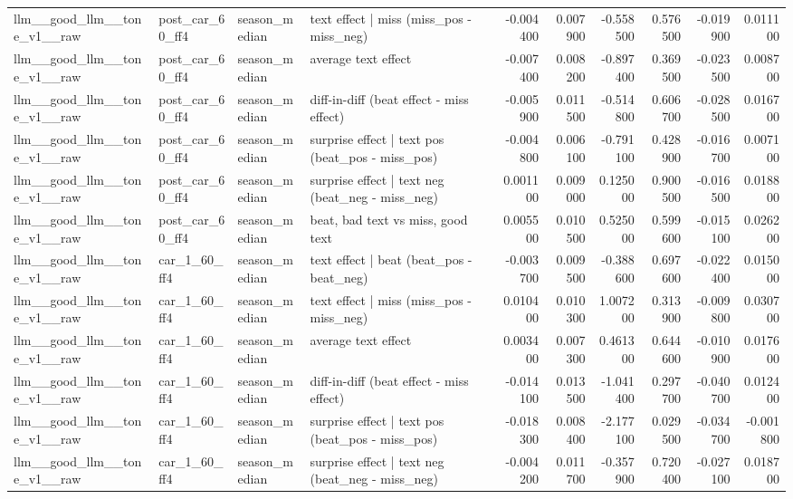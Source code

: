 \begin{table}
\begin{tabular}{llllrrrrrr}
llm\_\_good\_llm\_\_tone\_v1\_\_raw & post\_car\_60\_ff4 & season\_median & text effect | miss  (miss\_pos - miss\_neg) & -0.004400 & 0.007900 & -0.558500 & 0.576500 & -0.019900 & 0.011100 \\
llm\_\_good\_llm\_\_tone\_v1\_\_raw & post\_car\_60\_ff4 & season\_median & average text effect & -0.007400 & 0.008200 & -0.897400 & 0.369500 & -0.023500 & 0.008700 \\
llm\_\_good\_llm\_\_tone\_v1\_\_raw & post\_car\_60\_ff4 & season\_median & diff-in-diff (beat effect - miss effect) & -0.005900 & 0.011500 & -0.514800 & 0.606700 & -0.028500 & 0.016700 \\
llm\_\_good\_llm\_\_tone\_v1\_\_raw & post\_car\_60\_ff4 & season\_median & surprise effect | text pos (beat\_pos - miss\_pos) & -0.004800 & 0.006100 & -0.791100 & 0.428900 & -0.016700 & 0.007100 \\
llm\_\_good\_llm\_\_tone\_v1\_\_raw & post\_car\_60\_ff4 & season\_median & surprise effect | text neg (beat\_neg - miss\_neg) & 0.001100 & 0.009000 & 0.125000 & 0.900500 & -0.016500 & 0.018800 \\
llm\_\_good\_llm\_\_tone\_v1\_\_raw & post\_car\_60\_ff4 & season\_median & beat, bad text vs miss, good text & 0.005500 & 0.010500 & 0.525000 & 0.599600 & -0.015100 & 0.026200 \\
llm\_\_good\_llm\_\_tone\_v1\_\_raw & car\_1\_60\_ff4 & season\_median & text effect | beat  (beat\_pos - beat\_neg) & -0.003700 & 0.009500 & -0.388600 & 0.697600 & -0.022400 & 0.015000 \\
llm\_\_good\_llm\_\_tone\_v1\_\_raw & car\_1\_60\_ff4 & season\_median & text effect | miss  (miss\_pos - miss\_neg) & 0.010400 & 0.010300 & 1.007200 & 0.313900 & -0.009800 & 0.030700 \\
llm\_\_good\_llm\_\_tone\_v1\_\_raw & car\_1\_60\_ff4 & season\_median & average text effect & 0.003400 & 0.007300 & 0.461300 & 0.644600 & -0.010900 & 0.017600 \\
llm\_\_good\_llm\_\_tone\_v1\_\_raw & car\_1\_60\_ff4 & season\_median & diff-in-diff (beat effect - miss effect) & -0.014100 & 0.013500 & -1.041400 & 0.297700 & -0.040700 & 0.012400 \\
llm\_\_good\_llm\_\_tone\_v1\_\_raw & car\_1\_60\_ff4 & season\_median & surprise effect | text pos (beat\_pos - miss\_pos) & -0.018300 & 0.008400 & -2.177100 & 0.029500 & -0.034700 & -0.001800 \\
llm\_\_good\_llm\_\_tone\_v1\_\_raw & car\_1\_60\_ff4 & season\_median & surprise effect | text neg (beat\_neg - miss\_neg) & -0.004200 & 0.011700 & -0.357900 & 0.720400 & -0.027100 & 0.018700 \\

\end{tabular}
\end{table}
